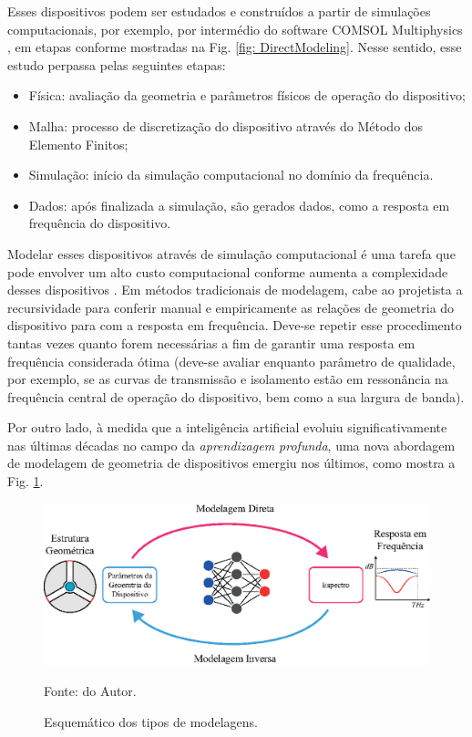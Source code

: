 Esses dispositivos podem ser estudados e construídos a partir de simulações computacionais, por exemplo, por intermédio do software COMSOL Multiphysics \textregistered, em etapas conforme mostradas na Fig. \ref{fig: DirectModeling}. Nesse sentido, esse estudo perpassa pelas seguintes etapas:

\begin{itemize}
    \item Física: avaliação da geometria e parâmetros físicos de operação do dispositivo;
    \item Malha: processo de discretização do dispositivo através do Método dos Elemento Finitos;
    \item Simulação: início da simulação computacional no domínio da frequência.
    \item Dados: após finalizada a simulação, são gerados dados, como a resposta em frequência do dispositivo.
\end{itemize}

Modelar esses dispositivos através de simulação computacional é uma tarefa que pode envolver um alto custo computacional conforme aumenta a complexidade desses dispositivos \cite{noureen2021deep,valkanas2019neural}. Em métodos tradicionais de modelagem, cabe ao projetista a recursividade para conferir manual e empiricamente as relações de geometria do dispositivo para com a resposta em frequência. Deve-se repetir esse procedimento tantas vezes quanto forem necessárias a fim de garantir uma resposta em frequência considerada ótima (deve-se avaliar enquanto parâmetro de qualidade, por exemplo, se as curvas de transmissão e isolamento estão em ressonância na frequência central de operação do dispositivo, bem como a sua largura de banda).

Por outro lado, à medida que a inteligência artificial evoluiu significativamente nas últimas décadas no campo da \textit{aprendizagem profunda}, uma nova abordagem de modelagem de geometria de dispositivos emergiu nos últimos, como mostra a Fig. \ref{fig: InverseDesign}.

\begin{figure}[H]
    \centering
    \includegraphics{04-Figuras/InverseDesign.eps}
    \caption{Esquemático dos tipos de modelagens.} \par
    Fonte: do Autor.
    \label{fig: InverseDesign}
\end{figure}

